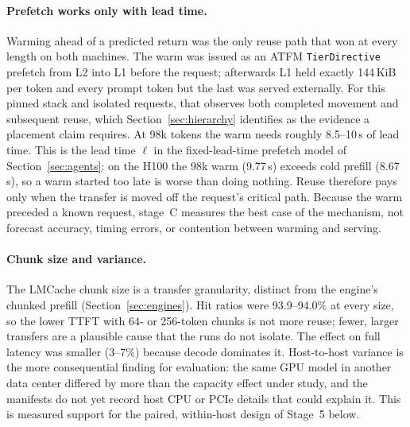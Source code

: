 \paragraph{Prefetch works only with lead time.}
Warming ahead of a predicted return was the only reuse path that won at every
length on both machines. The warm was issued as an ATFM \texttt{TierDirective}
prefetch from L2 into L1 before the request; afterwards L1 held exactly
144\,KiB per token and every prompt token but the last was served externally.
For this pinned stack and isolated requests, that observes both completed
movement and subsequent reuse, which Section~\ref{sec:hierarchy} identifies as
the evidence a placement claim requires. At 98k tokens the warm needs roughly
8.5--10\,s of lead time. This is the lead time $\ell$ in the fixed-lead-time
prefetch model of Section~\ref{sec:agents}: on the H100 the 98k warm (9.77\,s)
exceeds cold prefill (8.67\,s), so a warm started too late is worse than doing
nothing. Reuse therefore pays only when the transfer is moved off the request's
critical path. Because the warm preceded a known request, stage~C measures the
best case of the mechanism, not forecast accuracy, timing errors, or
contention between warming and serving.

\paragraph{Chunk size and variance.}
The LMCache chunk size is a transfer granularity, distinct from the engine's
chunked prefill (Section~\ref{sec:engines}). Hit ratios were 93.9--94.0\% at
every size, so the lower TTFT with 64- or 256-token chunks is not more reuse;
fewer, larger transfers are a plausible cause that the runs do not isolate.
The effect on full latency was smaller (3--7\%) because decode dominates it.
Host-to-host variance is the more consequential finding for evaluation: the
same GPU model in another data center differed by more than the capacity effect
under study, and the manifests do not yet record host CPU or PCIe details that
could explain it. This is measured support for the paired, within-host design
of Stage~5 below.

